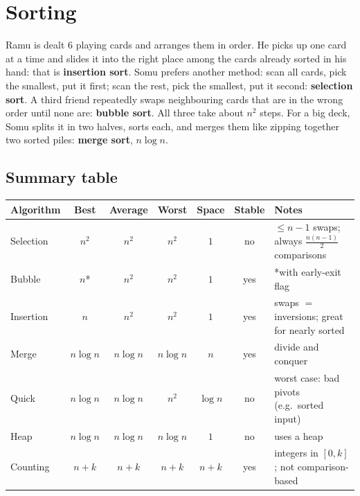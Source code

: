 \documentclass[11pt,a4paper]{article}
\begin{document}
\newpage
\section{Sorting}

\begin{story}
Ramu is dealt 6 playing cards and arranges them in order. He picks up one card at a time and slides it into the right place among the cards already sorted in his hand: that is \textbf{insertion sort}. Somu prefers another method: scan all cards, pick the smallest, put it first; scan the rest, pick the smallest, put it second: \textbf{selection sort}. A third friend repeatedly swaps neighbouring cards that are in the wrong order until none are: \textbf{bubble sort}. All three take about $n^2$ steps. For a big deck, Somu splits it in two halves, sorts each, and merges them like zipping together two sorted piles: \textbf{merge sort}, $n\log n$.
\end{story}

\subsection{Summary table}
\begin{center}
\small
\begin{tabularx}{\textwidth}{>{\raggedright\arraybackslash}p{2.4cm} c c c c c >{\raggedright\arraybackslash}X}
\toprule
\textbf{Algorithm} & \textbf{Best} & \textbf{Average} & \textbf{Worst} & \textbf{Space} & \textbf{Stable} & \textbf{Notes}\\
\midrule
Selection & $n^2$ & $n^2$ & $n^2$ & $1$ & no & $\le n-1$ swaps; always $\frac{n(n-1)}2$ comparisons\\
Bubble & $n$* & $n^2$ & $n^2$ & $1$ & yes & *with early-exit flag\\
Insertion & $n$ & $n^2$ & $n^2$ & $1$ & yes & swaps $=$ inversions; great for nearly sorted\\
Merge & $n\log n$ & $n\log n$ & $n\log n$ & $n$ & yes & divide and conquer\\
Quick & $n\log n$ & $n\log n$ & $n^2$ & $\log n$ & no & worst case: bad pivots (e.g.\ sorted input)\\
Heap & $n\log n$ & $n\log n$ & $n\log n$ & $1$ & no & uses a heap\\
Counting & $n+k$ & $n+k$ & $n+k$ & $n+k$ & yes & integers in $[0,k]$; not comparison-based\\
\bottomrule
\end{tabularx}
\end{center}
\end{document}
